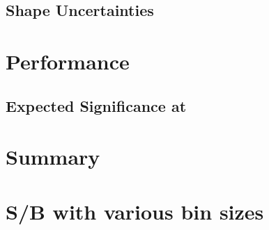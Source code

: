 \documentclass{cmspaper}
\begin{document}
  \subsection{Shape Uncertainties}
  \label{sec:shape_uncert}
  

%
\newpage
\section{Performance}
  \label{sec:performance}
  
  
  \subsection{Expected Significance at \intlumiEightTeV }
  \label{sec:exp_significance_12fb}
  
  
%  

%
\newpage
\section{Summary}
     \label{sec:summary}
     



\clearpage 
\appendix
\appendixpage
%     
  
  \newpage
  \section{S/B with various bin sizes}
     \label{app:binsize}
     
  
%     
\end{document}
